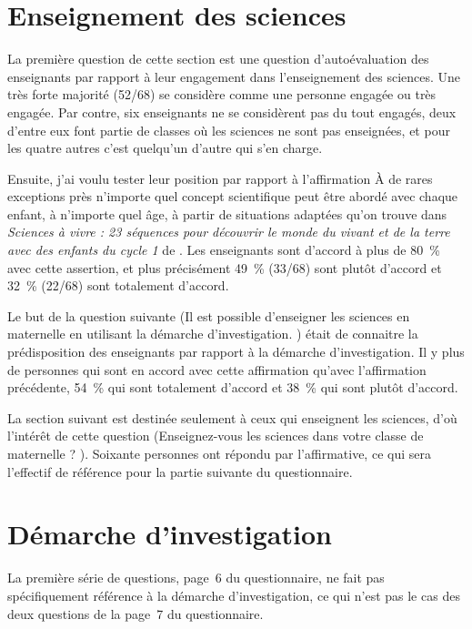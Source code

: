 \section{Enseignement des sciences}
La première question de cette section est une question d’autoévaluation des enseignants par rapport à leur engagement dans l’enseignement des sciences. Une très forte majorité (52/68) se considère comme une personne engagée ou très engagée. Par contre, six enseignants ne se considèrent pas du tout engagés, deux d’entre eux font partie de classes où les sciences ne sont pas enseignées, et pour les quatre autres c’est quelqu’un d’autre qui s’en charge.

Ensuite, j’ai voulu tester leur position par rapport à l’affirmation \og À de rares exceptions près n’importe quel concept scientifique peut être abordé avec chaque enfant, à n’importe quel âge, à partir de situations adaptées \fg{} qu’on trouve dans \textit{Sciences à vivre : 23 séquences pour découvrir le monde du vivant et de la terre avec des enfants du cycle 1} de . Les enseignants sont d’accord à plus de 80~\% avec cette assertion, et plus précisément 49~\% (33/68) sont plutôt d’accord et 32~\% (22/68) sont totalement d’accord.

Le but de la question suivante (\og Il est possible d’enseigner les sciences en maternelle en utilisant la démarche d’investigation. \fg{}) était de connaitre la prédisposition des enseignants par rapport à la démarche d’investigation. Il y plus de personnes qui sont en accord avec cette affirmation qu’avec l’affirmation précédente, 54~\% qui sont totalement d’accord et 38~\% qui sont plutôt d’accord.

La section suivant est destinée seulement à ceux qui enseignent les sciences, d’où l’intérêt de cette question (\og Enseignez-vous les sciences dans votre classe de maternelle ? \fg{}). Soixante personnes ont répondu par l’affirmative, ce qui sera l’effectif de référence pour la partie suivante du questionnaire.

\section{Démarche d’investigation}
La première série de questions, page~6 du questionnaire, ne fait pas spécifiquement référence à la démarche d’investigation, ce qui n’est pas le cas des deux questions de la page~7 du questionnaire.

